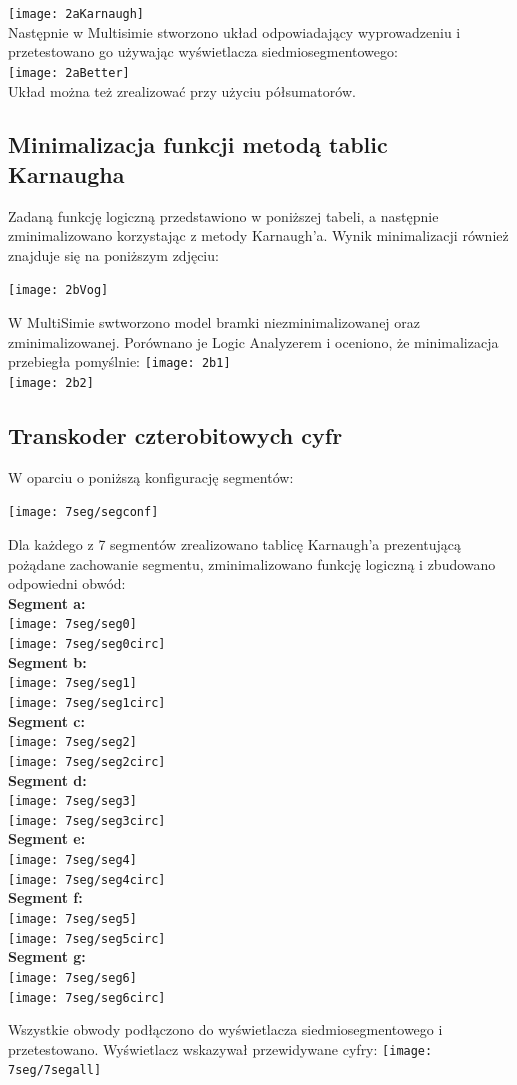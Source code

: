 \documentclass[12pt,a4paper]{article}
\begin{document}
\texttt{[image: 2aKarnaugh]}\\
Następnie w Multisimie stworzono układ odpowiadający wyprowadzeniu i przetestowano go używając wyświetlacza siedmiosegmentowego:\\
\texttt{[image: 2aBetter]}\\

Układ można też zrealizować przy użyciu półsumatorów.


\subsection{Minimalizacja funkcji metodą tablic Karnaugha}
Zadaną funkcję logiczną przedstawiono w poniższej tabeli, a następnie zminimalizowano korzystając z metody Karnaugh'a. Wynik minimalizacji również znajduje się na poniższym zdjęciu:

\centering
\texttt{[image: 2bVog]}\\
\raggedright
W MultiSimie swtworzono model bramki niezminimalizowanej oraz zminimalizowanej. Porównano je Logic Analyzerem i oceniono, że minimalizacja przebiegła pomyślnie:
\texttt{[image: 2b1]}\\
\texttt{[image: 2b2]}


\subsection{Transkoder czterobitowych cyfr}
\centering
W oparciu o poniższą konfigurację segmentów:


\centering
\texttt{[image: 7seg/segconf]}

\raggedright
Dla każdego z 7 segmentów zrealizowano tablicę Karnaugh'a prezentującą pożądane zachowanie segmentu, zminimalizowano funkcję logiczną i zbudowano odpowiedni obwód:\\
\centering
\textbf{Segment a:}\\
\texttt{[image: 7seg/seg0]}\\
\texttt{[image: 7seg/seg0circ]}\\
\textbf{Segment b:}\\
\texttt{[image: 7seg/seg1]}\\
\texttt{[image: 7seg/seg1circ]}\\
\textbf{Segment c:}\\
\texttt{[image: 7seg/seg2]}\\
\texttt{[image: 7seg/seg2circ]}\\
\textbf{Segment d:}\\
\texttt{[image: 7seg/seg3]}\\
\texttt{[image: 7seg/seg3circ]}\\
\textbf{Segment e:}\\
\texttt{[image: 7seg/seg4]}\\
\texttt{[image: 7seg/seg4circ]}\\
\textbf{Segment f:}\\
\texttt{[image: 7seg/seg5]}\\
\texttt{[image: 7seg/seg5circ]}\\
\textbf{Segment g:}\\
\texttt{[image: 7seg/seg6]}\\
\texttt{[image: 7seg/seg6circ]}\\
\raggedright

Wszystkie obwody podłączono do wyświetlacza siedmiosegmentowego i przetestowano. Wyświetlacz wskazywał przewidywane cyfry:
\centering
\texttt{[image: 7seg/7segall]}
\end{document}
